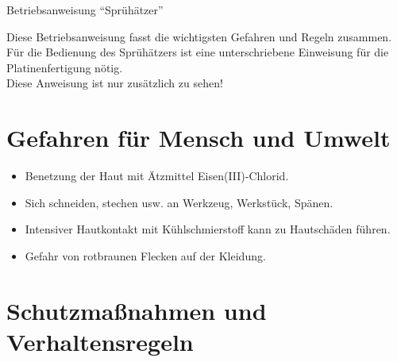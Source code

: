 \documentclass[fontsize=9pt]{scrartcl}
\newenvironment{smallitemize}{\begin{itemize}\itemsep -3pt}{\end{itemize}}
\begin{document}

\begin{center}
	\LARGE{Betriebsanweisung \enquote{Sprühätzer}}
\end{center}


\begin{center}
	Diese Betriebsanweisung fasst die wichtigsten Gefahren und Regeln zusammen.\\
	Für die Bedienung des Sprühätzers ist eine unterschriebene Einweisung für die Platinenfertigung nötig.\\
	Diese Anweisung ist nur zusätzlich zu sehen!\\
\end{center}

\section{Gefahren für Mensch und Umwelt}

\begin{smallitemize}
	\item Benetzung der Haut mit Ätzmittel Eisen(III)-Chlorid.
	\item Sich schneiden, stechen usw. an Werkzeug, Werkstück, Spänen.
	\item Intensiver Hautkontakt mit Kühlschmierstoff kann zu Hautschäden führen.
	\item Gefahr von rotbraunen Flecken auf der Kleidung.
\end{smallitemize}

\section{Schutzmaßnahmen und Verhaltensregeln}
\end{document}
